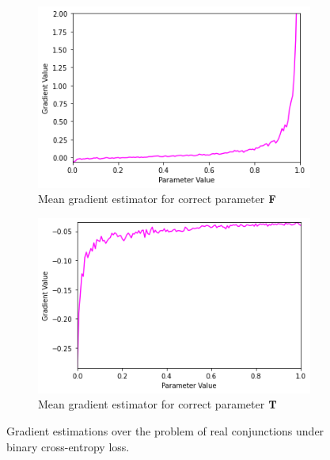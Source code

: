 \begin{figure}[H]
\begin{subfigure}[b]{0.47\textwidth}
        \label{fig:conjgrad1truebce}
    \end{subfigure}
    \begin{subfigure}[b]{0.47\textwidth}
        \centering
        \includegraphics[width=\textwidth]{imgs/grad_prod_bce_falseparam_10dim_avg.png}
        \caption{Mean gradient estimator for correct parameter $\textbf{F}$}
        \label{fig:conjgrad1falseavgbce}
    \end{subfigure}
    \begin{subfigure}[b]{0.47\textwidth}
        \centering
        \includegraphics[width=\textwidth]{imgs/grad_prod_bce_trueparam_10dim_avg.png}
        \caption{Mean gradient estimator for correct parameter $\textbf{T}$}
        \label{fig:conjgrad1trueavgbce}
    \end{subfigure}
       \caption{Gradient estimations over the problem of real conjunctions under binary cross-entropy loss.}
       \label{fig:conjgrad1bce}
\end{figure}

